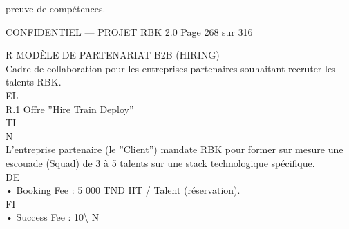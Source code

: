 preuve de compétences.\\
\vspace{0.5em}
\vspace{0.5em}
\vspace{0.5em}
\vspace{0.5em}
\begin{confidential}CONFIDENTIEL — PROJET RBK 2.0                                            Page 268 sur 316\end{confidential}
R \textbar{} MODÈLE DE PARTENARIAT B2B (HIRING)\\
\vspace{0.5em}
\vspace{0.5em}
Cadre de collaboration pour les entreprises partenaires souhaitant recruter les talents RBK.\\
\vspace{0.5em}
\vspace{0.5em}
\vspace{0.5em}
\vspace{0.5em}
EL\\
R.1    Offre ”Hire Train Deploy”\\
\vspace{0.5em}
\vspace{0.5em}
\vspace{0.5em}
\vspace{0.5em}
TI\\
N\\
L’entreprise partenaire (le ”Client”) mandate RBK pour former sur mesure une escouade (Squad) de 3 à 5 talents sur une stack technologique spécifique.\\
\vspace{0.5em}
\vspace{0.5em}
\vspace{0.5em}
\vspace{0.5em}
DE\\
• Booking Fee : 5 000 TND HT / Talent (réservation).\\
\vspace{0.5em}
\vspace{0.5em}
\vspace{0.5em}
\vspace{0.5em}
FI\\
• Success Fee : 10\textbackslash{}%
\vspace{0.5em}
\vspace{0.5em}
\vspace{0.5em}
N\\
